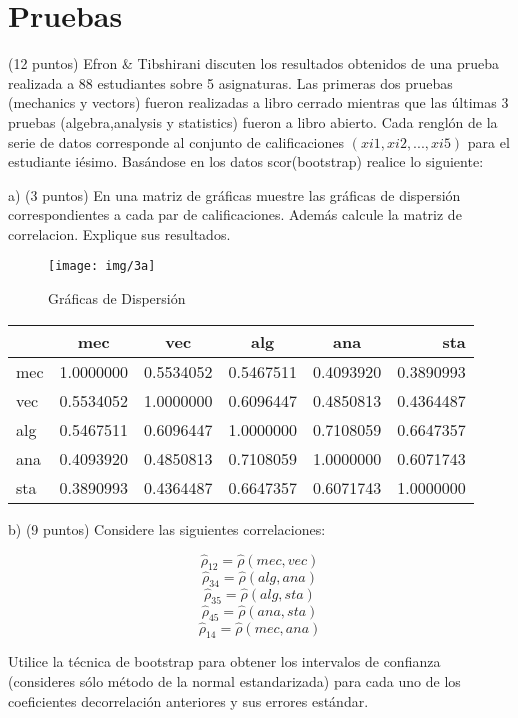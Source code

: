 \documentclass[11pt]{article}
\begin{document}
\section{Pruebas}
\noindent (12 puntos) Efron \& Tibshirani discuten los resultados obtenidos de una prueba realizada a 88 estudiantes sobre 5 asignaturas. Las primeras dos pruebas (mechanics y vectors) fueron realizadas a libro cerrado mientras que las últimas 3 pruebas (algebra,analysis y statistics) fueron a libro abierto. Cada renglón de la serie de datos corresponde al conjunto de calificaciones $(xi1 , xi2 , . . . , xi5 )$ para el estudiante iésimo. Basándose en los datos scor(bootstrap) realice lo siguiente:

\noindent a) (3 puntos) En una matriz de gráficas muestre las gráficas de dispersión correspondientes a cada par de calificaciones. Además calcule la matriz de correlacion. Explique sus resultados.

\begin{figure} [H]
	\texttt{[image: img/3a]}
	\caption[]{Gráficas de Dispersión}
\label{fig:fig1}
\end{figure}

\begin{tabular}{ l | c c c c r }
     &    mec &     vec &     alg  &    ana  &    sta \\ \hline
mec & 1.0000000 & 0.5534052 & 0.5467511 & 0.4093920 & 0.3890993 \\
vec & 0.5534052 & 1.0000000 & 0.6096447 & 0.4850813 & 0.4364487 \\
alg & 0.5467511 & 0.6096447 & 1.0000000 & 0.7108059 & 0.6647357 \\
ana & 0.4093920 & 0.4850813 & 0.7108059 & 1.0000000 & 0.6071743 \\
sta & 0.3890993 & 0.4364487 & 0.6647357 & 0.6071743 & 1.0000000 \\
\end{tabular}

\noindent b) (9 puntos) Considere las siguientes correlaciones:

$$ \hat{\rho}_{12}=\hat{\rho}(mec,vec) $$
$$ \hat{\rho}_{34}=\hat{\rho}(alg,ana) $$
$$ \hat{\rho}_{35}=\hat{\rho}(alg,sta) $$
$$ \hat{\rho}_{45}=\hat{\rho}(ana,sta) $$
$$ \hat{\rho}_{14}=\hat{\rho}(mec,ana) $$

\noindent Utilice la técnica de bootstrap para obtener los intervalos de confianza (consideres sólo método de la normal estandarizada) para cada uno de los coeficientes decorrelación anteriores y sus errores estándar.
\end{document}
